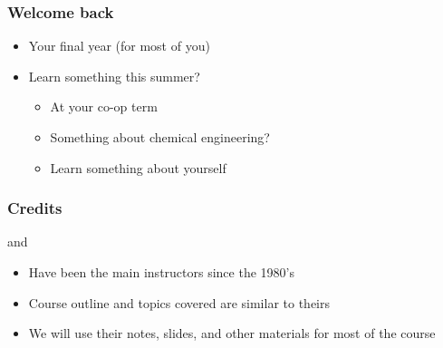 

\begin{frame}\frametitle{Welcome back}
	\begin{itemize}
		\item	Your final year (for most of you)
		\item	Learn something this summer?
			\begin{itemize}
				\item	At your co-op term
				\item	Something about chemical engineering?
				\item	Learn something about yourself
			\end{itemize}
	\end{itemize}
\end{frame}

\begin{frame}\frametitle{Credits}
	\begin{exampleblock}{}
		\centering {\color{myOrange}{Dr. Don Woods}} and {\color{myBlue}{Dr. Thomas Marlin}}
	\end{exampleblock}
	\begin{itemize}
		\item	Have been the main instructors since the 1980's
		\item	Course outline and topics covered are similar to theirs
		\item	We will use their notes, slides, and other materials for most of the course
	\end{itemize}
\end{frame}

